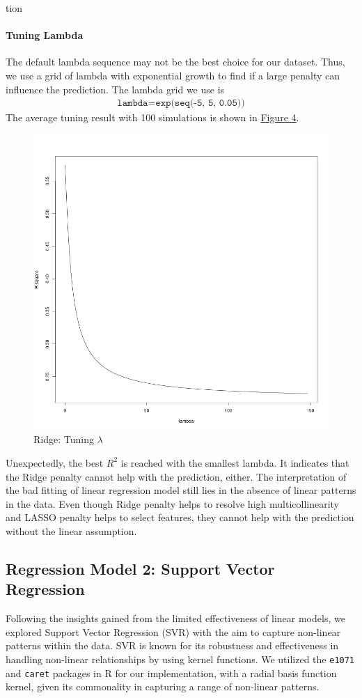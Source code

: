 tion\documentclass[8pt]{article}
\begin{document}
\begin{enumerate}
\paragraph{Tuning Lambda}
The default lambda sequence may not be the best choice for our dataset.
Thus, we use a grid of lambda with exponential growth to find 
if a large penalty can influence the prediction. The lambda grid we use is 
\begin{align*}
    \texttt{lambda} = \texttt{exp(seq(-5, 5, 0.05))}
\end{align*}
The average tuning result with 100 simulations is shown in \hyperref[fig:lambda]{Figure 4}.
\begin{figure}[H]
    \centering
    \includegraphics*[scale=0.25]{figures/lambda.png}
    \caption{Ridge: Tuning $\lambda$}
\label{fig:lambda}
\end{figure}
Unexpectedly, the best $R^2$ is reached with the smallest lambda. 
It indicates that the Ridge penalty cannot help with the prediction, either. 
The interpretation of the bad fitting of linear regression model still lies in the absence of linear patterns in the data.
Even though Ridge penalty helps to resolve high multicollinearity and LASSO penalty 
helps to select features, they cannot help with the prediction without the linear assumption.

\subsection{Regression Model 2: Support Vector Regression}
Following the insights gained from the limited effectiveness of linear models, we explored Support Vector Regression (SVR) with the aim to capture non-linear patterns within the data. SVR is known for its robustness and effectiveness in handling non-linear relationships by using kernel functions. We utilized the \texttt{e1071} and \texttt{caret} packages in R for our implementation, with a radial basis function kernel, given its commonality in capturing a range of non-linear patterns.


\end{enumerate}
\end{document}
